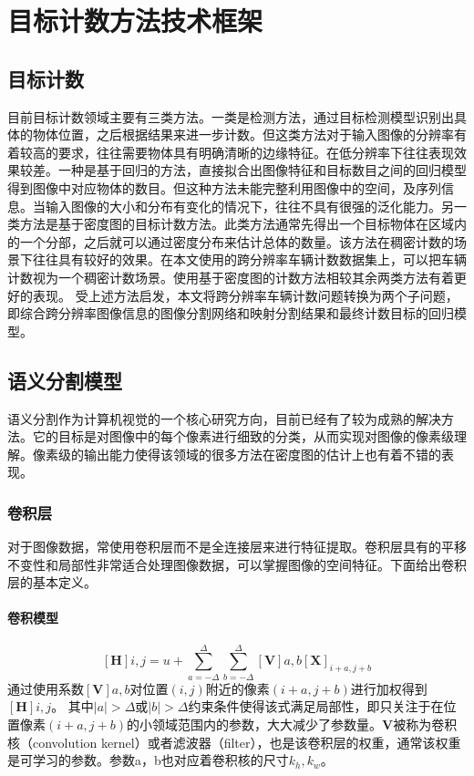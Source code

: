 
\chapter{目标计数方法技术框架}
\section{目标计数}
目前目标计数领域主要有三类方法。一类是检测方法，通过目标检测模型识别出具体的物体位置，之后根据结果来进一步计数。但这类方法对于输入图像的分辨率有着较高的要求，往往需要物体具有明确清晰的边缘特征。在低分辨率下往往表现效果较差。一种是基于回归的方法，直接拟合出图像特征和目标数目之间的回归模型得到图像中对应物体的数目。但这种方法未能完整利用图像中的空间，及序列信息。当输入图像的大小和分布有变化的情况下，往往不具有很强的泛化能力。另一类方法是基于密度图的目标计数方法。此类方法通常先得出一个目标物体在区域内的一个分部，之后就可以通过密度分布来估计总体的数量。该方法在稠密计数的场景下往往具有较好的效果。在本文使用的跨分辨率车辆计数数据集上，可以把车辆计数视为一个稠密计数场景。使用基于密度图的计数方法相较其余两类方法有着更好的表现。
受上述方法启发，本文将跨分辨率车辆计数问题转换为两个子问题，即综合跨分辨率图像信息的图像分割网络和映射分割结果和最终计数目标的回归模型。
\section{语义分割模型}
语义分割作为计算机视觉的一个核心研究方向，目前已经有了较为成熟的解决方法。它的目标是对图像中的每个像素进行细致的分类，从而实现对图像的像素级理解。像素级的输出能力使得该领域的很多方法在密度图的估计上也有着不错的表现。
\subsection{卷积层}
对于图像数据，常使用卷积层而不是全连接层来进行特征提取。卷积层具有的平移不变性和局部性非常适合处理图像数据，可以掌握图像的空间特征。下面给出卷积层的基本定义。
\subsubsection{卷积模型}
\begin{equation}
  \label{eq:eq_conv-layer}
  [\mathbf{H}]{i, j} = u + \sum_{a = -\Delta}^{\Delta} \sum_{b = -\Delta}^{\Delta} [\mathbf{V }]{a, b} [\mathbf{X}]_{i+a, j+b}
\end{equation}
通过使用系数$[\mathbf{V}]{a, b}$对位置$(i, j)$附近的像素$(i+a, j+b)$进行加权得到$[\mathbf{H}]{i, j}$。 其中$|a|> \Delta$或$|b| > \Delta$约束条件使得该式满足局部性，即只关注于在位置像素$(i+a, j+b)$的小领域范围内的参数，大大减少了参数量。$\mathbf{V}$被称为卷积核（convolution kernel）或者滤波器（filter），也是该卷积层的权重，通常该权重是可学习的参数。参数a，b也对应着卷积核的尺寸$k_h,k_w$。
